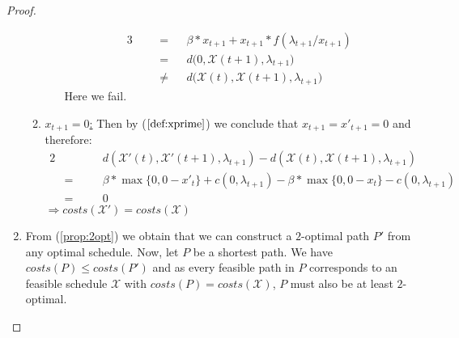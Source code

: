 \documentclass[hidelinks]{article}
\theoremstyle{plain}
\theoremstyle{definition}
\theoremstyle{rem}
\newcommand{\mx}{\mathcal{X}}
\begin{document}
\begin{sloppypar}
\begin{proof}
\begin{enumerate}
\begin{enumerate}
\begin{enumerate}[(i)]
\begin{alignat*}{3}
				&&&=&&\beta*x_{t+1}+x_{t+1}*f(\lambda_{t+1}/x_{t+1})\\
				&&&=&&d\bigl(0,\mx(t+1),\lambda_{t+1}\bigr)\\
				&&&\ne&&d\bigl(\mx(t),\mx(t+1),\lambda_{t+1}\bigr)
			\end{alignat*}
			Here we fail.
		\end{enumerate}
		\item \underline{$x_{t+1}=0$:} Then by ($\ref{def:xprime}$) we conclude that $x_{t+1}=x'_{t+1}=0$ and therefore:
		\begin{alignat*}{2}
			&&&d(\mx'(t),\mx'(t+1),\lambda_{t+1})-d(\mx(t),\mx(t+1),\lambda_{t+1})\\
			&=\quad&&\beta*\max\{0,0-x'_t\}+c(0,\lambda_{t+1})-\beta*\max\{0,0-x_t\}-c(0,\lambda_{t+1})\\
			&=&&0
		\end{alignat*}
		$\Rightarrow costs(\mx')=costs(\mx)$
	\end{enumerate}
	\item From (\ref{prop:2opt}) we obtain that we can construct a $2$-optimal path $P'$ from any optimal schedule. Now, let $P$ be a shortest path. We have $costs(P)\le costs(P')$ and as every feasible path in $P$ corresponds to an feasible schedule $\mx$ with $costs(P)=costs(\mx)$, $P$ must also be at least $2$-optimal.
\end{enumerate}
\end{proof}

\end{sloppypar}
\end{document}
